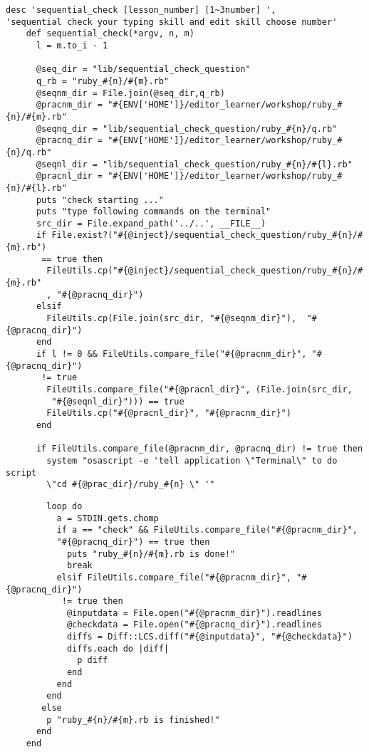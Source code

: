 \begin{screen}
{\small
\begin{verbatim}
desc 'sequential_check [lesson_number] [1~3number] ',
'sequential check your typing skill and edit skill choose number'
    def sequential_check(*argv, n, m)
      l = m.to_i - 1
     
      @seq_dir = "lib/sequential_check_question"
      q_rb = "ruby_#{n}/#{m}.rb"
      @seqnm_dir = File.join(@seq_dir,q_rb)
      @pracnm_dir = "#{ENV['HOME']}/editor_learner/workshop/ruby_#{n}/#{m}.rb"
      @seqnq_dir = "lib/sequential_check_question/ruby_#{n}/q.rb"
      @pracnq_dir = "#{ENV['HOME']}/editor_learner/workshop/ruby_#{n}/q.rb"      
      @seqnl_dir = "lib/sequential_check_question/ruby_#{n}/#{l}.rb"
      @pracnl_dir = "#{ENV['HOME']}/editor_learner/workshop/ruby_#{n}/#{l}.rb"      
      puts "check starting ..."
      puts "type following commands on the terminal"
      src_dir = File.expand_path('../..', __FILE__)
      if File.exist?("#{@inject}/sequential_check_question/ruby_#{n}/#{m}.rb")
       == true then
        FileUtils.cp("#{@inject}/sequential_check_question/ruby_#{n}/#{m}.rb"
        , "#{@pracnq_dir}")
      elsif
        FileUtils.cp(File.join(src_dir, "#{@seqnm_dir}"),  "#{@pracnq_dir}")
      end
      if l != 0 && FileUtils.compare_file("#{@pracnm_dir}", "#{@pracnq_dir}")
       != true
        FileUtils.compare_file("#{@pracnl_dir}", (File.join(src_dir,
         "#{@seqnl_dir}"))) == true
        FileUtils.cp("#{@pracnl_dir}", "#{@pracnm_dir}")
      end
      
      if FileUtils.compare_file(@pracnm_dir, @pracnq_dir) != true then
        system "osascript -e 'tell application \"Terminal\" to do script 
        \"cd #{@prac_dir}/ruby_#{n} \" '"
\end{verbatim}}
\end{screen}
\begin{screen}
{\small
\begin{verbatim}            
        loop do
          a = STDIN.gets.chomp
          if a == "check" && FileUtils.compare_file("#{@pracnm_dir}", 
          "#{@pracnq_dir}") == true then
            puts "ruby_#{n}/#{m}.rb is done!"
            break
          elsif FileUtils.compare_file("#{@pracnm_dir}", "#{@pracnq_dir}")
           != true then
            @inputdata = File.open("#{@pracnm_dir}").readlines
            @checkdata = File.open("#{@pracnq_dir}").readlines
            diffs = Diff::LCS.diff("#{@inputdata}", "#{@checkdata}")
            diffs.each do |diff|
              p diff
            end
          end
        end
       else
        p "ruby_#{n}/#{m}.rb is finished!"
      end
    end
\end{verbatim}}
\end{screen}

